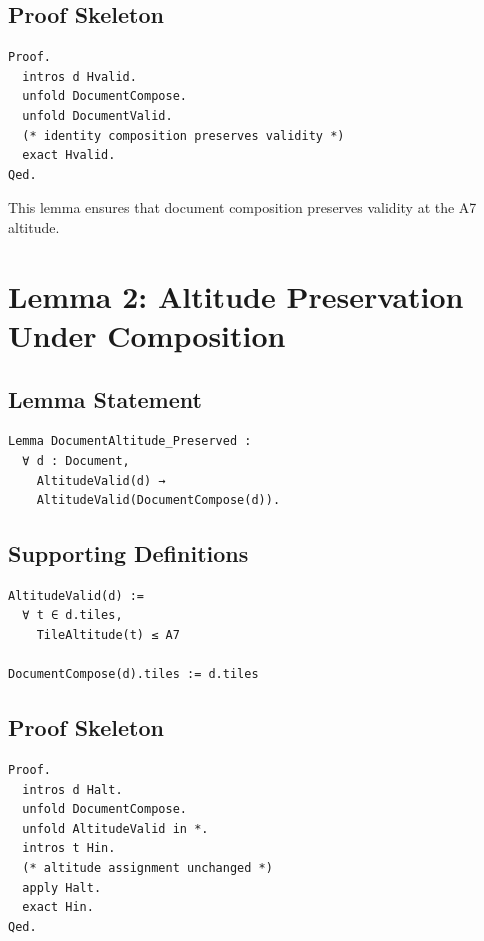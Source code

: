 \documentclass[11pt]{article}
\begin{document}
\subsection{Proof Skeleton}

\begin{verbatim}
Proof.
  intros d Hvalid.
  unfold DocumentCompose.
  unfold DocumentValid.
  (* identity composition preserves validity *)
  exact Hvalid.
Qed.
\end{verbatim}

This lemma ensures that document composition preserves validity at the A7
altitude.

\newpage


\section{Lemma 2: Altitude Preservation Under Composition}

\subsection{Lemma Statement}

\begin{verbatim}
Lemma DocumentAltitude_Preserved :
  ∀ d : Document,
    AltitudeValid(d) →
    AltitudeValid(DocumentCompose(d)).
\end{verbatim}

\subsection{Supporting Definitions}

\begin{verbatim}
AltitudeValid(d) :=
  ∀ t ∈ d.tiles,
    TileAltitude(t) ≤ A7

DocumentCompose(d).tiles := d.tiles
\end{verbatim}

\subsection{Proof Skeleton}

\begin{verbatim}
Proof.
  intros d Halt.
  unfold DocumentCompose.
  unfold AltitudeValid in *.
  intros t Hin.
  (* altitude assignment unchanged *)
  apply Halt.
  exact Hin.
Qed.
\end{verbatim}
\end{document}

